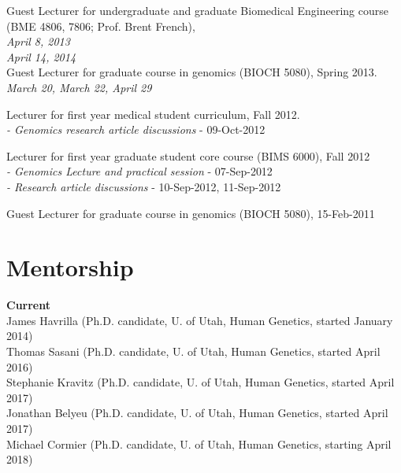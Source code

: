 \documentclass[margin,line]{cv}
\begin{document}
\begin{resume}
    \vspace{-2mm}
    Guest Lecturer for undergraduate and graduate Biomedical Engineering course (BME 4806, 7806; Prof. Brent French), \\
    \emph{April 8, 2013} \\
    \emph{April 14, 2014} \\


    Guest Lecturer for graduate course in genomics (BIOCH 5080), Spring 2013. \\
	\emph{March 20, March 22, April 29}

    Lecturer for first year medical student curriculum, Fall 2012. \\
	\emph{- Genomics research article discussions} - 09-Oct-2012

    \vspace{-2mm}
    Lecturer for first year graduate student core course (BIMS 6000), Fall 2012 \\
	\emph{- Genomics Lecture and practical session} - 07-Sep-2012 \\
	\emph{- Research article discussions} - 10-Sep-2012, 11-Sep-2012

    \vspace{-2mm}
    Guest Lecturer for graduate course in genomics (BIOCH 5080), 15-Feb-2011



    \section{\mysidestyle Mentorship}
    \textbf{Current} \\
    James Havrilla (Ph.D. candidate, U. of Utah, Human Genetics, started January 2014) \\
    Thomas Sasani (Ph.D. candidate, U. of Utah, Human Genetics, started April 2016) \\
    Stephanie Kravitz (Ph.D. candidate, U. of Utah, Human Genetics, started April 2017) \\
    Jonathan Belyeu (Ph.D. candidate, U. of Utah, Human Genetics, started April 2017) \\
    Michael Cormier (Ph.D. candidate, U. of Utah, Human Genetics, starting April 2018) \\



\end{resume}
\end{document}
